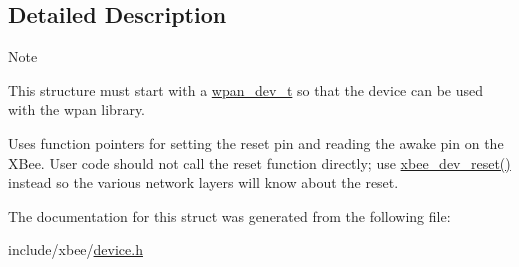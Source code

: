 \subsection{Detailed Description}
\begin{DoxyNote}{Note}

\begin{DoxyItemize}
\item This structure must start with a \hyperlink{structwpan__dev__t}{wpan\-\_\-dev\-\_\-t} so that the device can be used with the wpan library.
\end{DoxyItemize}
\end{DoxyNote}

\begin{DoxyItemize}
\item Uses function pointers for setting the reset pin and reading the awake pin on the X\-Bee. User code should not call the reset function directly; use \hyperlink{group__xbee__device_gad312efa700cca7ca044cddf364cc51f5}{xbee\-\_\-dev\-\_\-reset()} instead so the various network layers will know about the reset. 
\end{DoxyItemize}

The documentation for this struct was generated from the following file\-:\begin{DoxyCompactItemize}
\item 
include/xbee/\hyperlink{device_8h}{device.\-h}\end{DoxyCompactItemize}
